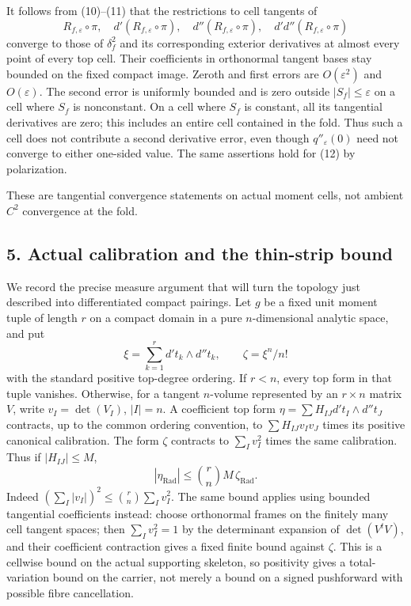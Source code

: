 \documentclass[
  11pt,
]{article}
\begin{document}
It follows from (10)--(11) that the restrictions to cell tangents of \[
 R_{f,\varepsilon}\circ\pi,\quad d'(R_{f,\varepsilon}\circ\pi),
 \quad d''(R_{f,\varepsilon}\circ\pi),\quad
 d'd''(R_{f,\varepsilon}\circ\pi)                          \tag{13}
\] converge to those of \(\delta_f^2\) and its corresponding exterior
derivatives at almost every point of every top cell. Their coefficients
in orthonormal tangent bases stay bounded on the fixed compact image.
Zeroth and first errors are \(O(\varepsilon^2)\) and \(O(\varepsilon)\).
The second error is uniformly bounded and is zero outside
\(|S_f|\leq\varepsilon\) on a cell where \(S_f\) is nonconstant. On a
cell where \(S_f\) is constant, all its tangential derivatives are zero;
this includes an entire cell contained in the fold. Thus such a cell
does not contribute a second derivative error, even though
\(q''_\varepsilon(0)\) need not converge to either one-sided value. The
same assertions hold for (12) by polarization.

These are tangential convergence statements on actual moment cells, not
ambient \(C^2\) convergence at the fold.

\subsection{5. Actual calibration and the thin-strip
bound}\label{actual-calibration-and-the-thin-strip-bound}

We record the precise measure argument that will turn the topology just
described into differentiated compact pairings. Let \(g\) be a fixed
unit moment tuple of length \(r\) on a compact domain in a pure
\(n\)-dimensional analytic space, and put \[
 \xi=\sum_{k=1}^r d't_k\wedge d''t_k,\qquad
 \zeta=\xi^n/n!
\] with the standard positive top-degree ordering. If \(r<n\), every top
form in that tuple vanishes. Otherwise, for a tangent \(n\)-volume
represented by an \(r\times n\) matrix \(V\), write \(v_I=\det(V_I)\),
\(|I|=n\). A coefficient top form \(\eta=\sum H_{IJ}d't_I\wedge d''t_J\)
contracts, up to the common ordering convention, to
\(\sum H_{IJ}v_Iv_J\) times its positive canonical calibration. The form
\(\zeta\) contracts to \(\sum_Iv_I^2\) times the same calibration. Thus
if \(|H_{IJ}|\leq M\), \[
 |\eta_{\mathrm{Rad}}|
      \leq {r\choose n}M\,\zeta_{\mathrm{Rad}}.             \tag{14}
\] Indeed \((\sum_I|v_I|)^2\leq {r\choose n}\sum_Iv_I^2\). The same
bound applies using bounded tangential coefficients instead: choose
orthonormal frames on the finitely many cell tangent spaces; then
\(\sum_Iv_I^2=1\) by the determinant expansion of \(\det(V^tV)\), and
their coefficient contraction gives a fixed finite bound against
\(\zeta\). This is a cellwise bound on the actual supporting skeleton,
so positivity gives a total-variation bound on the carrier, not merely a
bound on a signed pushforward with possible fibre cancellation.
\end{document}
